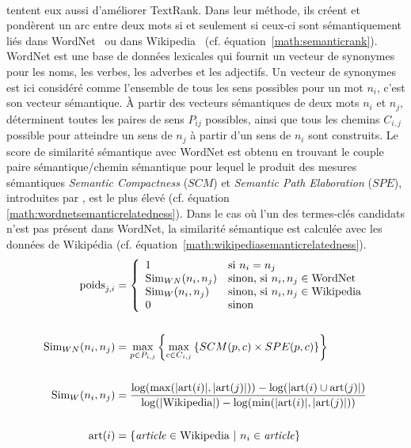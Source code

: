         ~\\ tentent eux aussi d'améliorer
        TextRank. Dans leur méthode, ils créent et pondèrent un arc entre deux
        mots si et seulement si ceux-ci sont sémantiquement liés dans
        WordNet~\cite{miller1995wordnet} ou dans
        Wikipedia~\cite{milne2008wikipediasemanticrelatedness} (cf.
        équation~\ref{math:semanticrank}). WordNet est une base de données
        lexicales qui fournit un vecteur de synonymes pour les noms, les verbes,
        les adverbes et les adjectifs. Un vecteur de synonymes est ici considéré
        comme l'ensemble de tous les sens possibles pour un mot $n_i$, c'est son
        vecteur sémantique. À partir des vecteurs sémantiques de deux mots $n_i$
        et $n_j$,  déterminent toutes les
        paires de sens $P_{ij}$ possibles, ainsi que tous les chemins $C_{i,
        j}$ possible pour atteindre un sens de $n_j$ à partir d'un sens de $n_i$
        sont construits. Le score de similarité sémantique avec WordNet est
        obtenu en trouvant le couple paire sémantique/chemin sémantique pour
        lequel le produit des mesures sémantiques \textit{Semantic Compactness}
        ($SCM$) et \textit{Semantic Path Elaboration} ($SPE$), introduites par
        , est le plus élevé (cf.
        équation \ref{math:wordnetsemanticrelatedness}). Dans le cas où l'un des
        termes-clés candidats n'est pas présent dans WordNet, la similarité
        sémantique est calculée avec les données de Wikipédia (cf.
        équation~\ref{math:wikipediasemanticrelatedness}).
        \begin{align}
          \text{poids}_{j, i} &= \left\{\begin{array}{ll}
            1 & \text{si $n_i = n_j$}\\
            \text{Sim}_{WN}(n_i, n_j) & \text{sinon, si $n_i, n_j \in \text{WordNet}$}\\
             \text{Sim}_{W}(n_i, n_j) &  \text{sinon, si $n_i, n_j \in \text{Wikipedia}$}\\
            0 & \text{sinon}
          \end{array}\right. \label{math:semanticrank}\\
          \notag\\
          \text{Sim}_{WN}(n_i, n_j) &= \max_{p \in P_{i, j}}\left\{\max_{c \in C_{i, j}}\left\{SCM(p, c) \times SPE(p, c)\right\}\right\} \label{math:wordnetsemanticrelatedness}\\
          \notag\\
          \text{Sim}_{W}(n_i, n_j) &= \frac{\log(\max(|\text{art}(i)|, |\text{art}(j)|)) - \log(|\text{art}(i) \cup \text{art}(j)|)}{\log(|\text{Wikipedia}|) - \log(\min(|\text{art}(i)|, |\text{art}(j)|))} \label{math:wikipediasemanticrelatedness}\\
          \notag\\
          \text{art}(i) &= \left\{\text{\textit{article}} \in \text{Wikipedia}\ |\ n_i \in \text{\textit{article}}\right\} \notag
        \end{align}

